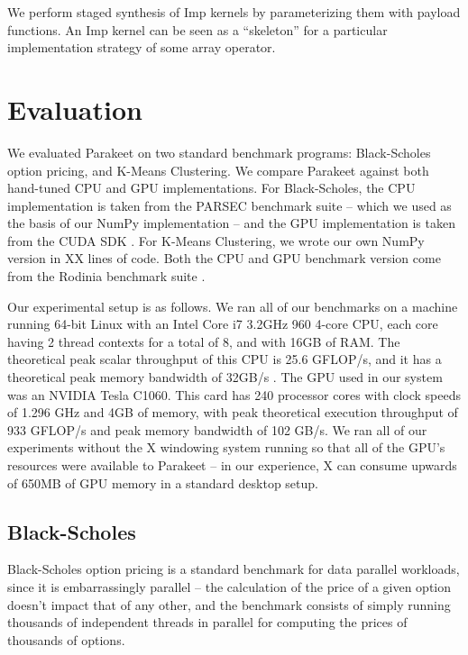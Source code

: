 \documentclass[10pt,twocolumn]{article}
\begin{document}
We perform staged synthesis of Imp kernels by parameterizing them with payload functions. An Imp kernel can be seen as a ``skeleton'' \cite{Cole04} for a particular implementation strategy of some array operator.  

\section{Evaluation}
\label{Evaluation}

We evaluated Parakeet on two standard benchmark programs: Black-Scholes option pricing, and K-Means Clustering.  We compare Parakeet against both hand-tuned CPU and GPU implementations.  For Black-Scholes, the CPU implementation is taken from the PARSEC \cite{Bien08} benchmark suite -- which we used as the basis
of our NumPy implementation -- and the GPU implementation is taken from the CUDA SDK \cite{NvidSD}.  For K-Means Clustering, we wrote our own NumPy version in XX lines of code.  Both the CPU and GPU benchmark version come from the Rodinia benchmark suite \cite{Che09}.

Our experimental setup is as follows.  We ran all of our benchmarks on a machine running 64-bit Linux with an Intel Core i7 3.2GHz 960 4-core CPU, each core having 2 thread contexts for a total of 8, and with 16GB of RAM.  The theoretical peak scalar throughput of this CPU is 25.6 GFLOP/s, and it has a theoretical peak memory bandwidth of 32GB/s \cite{Lee10}.  The GPU used in our system was an NVIDIA Tesla C1060. This card has 240 processor cores with clock speeds of 1.296 GHz and 4GB of memory, with peak theoretical execution throughput of 933 GFLOP/s and peak memory bandwidth of 102 GB/s.  We ran all of our experiments without the X windowing system running so that all of the GPU's resources were available to Parakeet -- in our experience, X can consume upwards of 650MB of GPU memory in a standard desktop setup.

\subsection{Black-Scholes}
\label{results-bs}

Black-Scholes option pricing \cite{Blac73} is a standard benchmark for data parallel workloads, since it is embarrassingly parallel -- the calculation of the price of a given option doesn't impact that of any other, and the benchmark consists of simply running thousands of independent threads in parallel for computing the prices of thousands of options.
\end{document}
